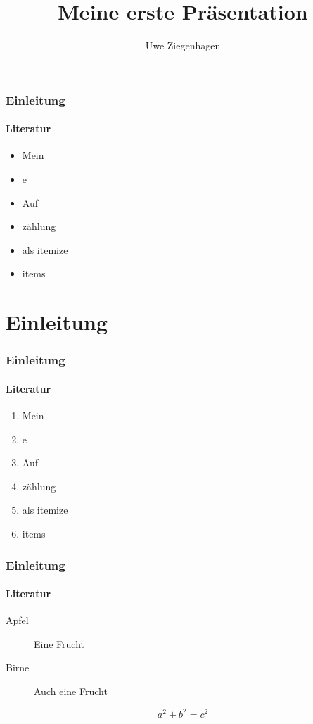 \documentclass[12pt,ngerman]{beamer}
\author{Uwe Ziegenhagen}
\title{Meine erste Präsentation}
\institute{Dante e.V. Heidelberg}
\begin{document}
\begin{frame}

\maketitle

\end{frame}

\begin{frame}

\tableofcontents

\end{frame}

\usebackgroundtemplate{}

\begin{frame}
\frametitle{Einleitung}
\framesubtitle{Literatur}

\begin{itemize}
	\item Mein
	\item e
	\item Auf
	\item zählung
	\item als itemize
	\item items
\end{itemize}

\end{frame}

\section{Einleitung}

\begin{frame}
\frametitle{Einleitung}
\framesubtitle{Literatur}

\begin{enumerate}
	\item<1-> Mein
	\item<2> e
	\item<1,3,4> Auf
	\item<-3> zählung
	\item als itemize
	\item items
\end{enumerate}

\end{frame}

\begin{frame}
\frametitle{Einleitung}
\framesubtitle{Literatur}

\begin{description}
	\item[Apfel] Eine \textcolor{fuh}{Frucht}
	\item[Birne] Auch eine \textcolor{FUH}{Frucht}
\end{description}

\[ a^2 + b^2 = c^2 \]

\end{frame}
\end{document}
